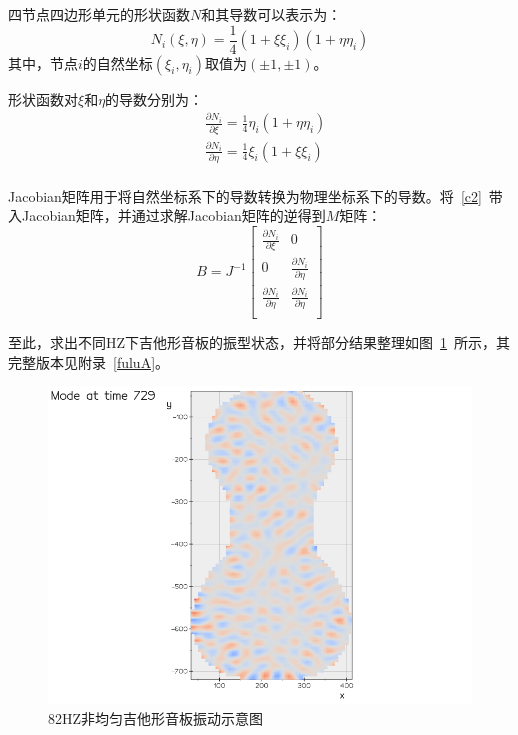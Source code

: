\documentclass[withoutpreface,bwprint]{cumcmthesis} %
\begin{document}
	四节点四边形单元的形状函数$N$和其导数可以表示为：
	\begin{equation}
		N_i(\xi,\eta)=\frac{1}{4}(1+\xi \xi_i)(1+\eta \eta_i)\label{c1}
	\end{equation}
	其中，节点$i$的自然坐标$(\xi_i,\eta_i)$取值为$(\pm1,\pm1)$。
	
	形状函数对$\xi$和$\eta$的导数分别为：
	\begin{equation}
		\begin{aligned} 
		&\frac{\partial N_i}{\partial \xi}=\frac{1}{4}\eta_i(1+\eta \eta_i)\\
		&\frac{\partial N_i}{\partial \eta}=\frac{1}{4}\xi_i(1+\xi \xi_i)\\
	\end{aligned}\label{c2}
	\end{equation}
		
	Jacobian矩阵用于将自然坐标系下的导数转换为物理坐标系下的导数。将~\eqref{c2}~带入Jacobian矩阵，并通过求解Jacobian矩阵的逆得到$M$矩阵：
		\begin{equation}
		B=J^{-1}\begin{bmatrix}
			\frac{\partial N_i}{\partial \xi}&0\\
			0&\frac{\partial N_i}{\partial \eta}\\
			\frac{\partial N_i}{\partial \eta}&\frac{\partial N_i}{\partial \eta}\\
		\end{bmatrix}\label{c3}
	\end{equation}

至此，求出不同HZ下吉他形音板的振型状态，并将部分结果整理如图~\ref{guitarbufen}~所示，其完整版本见附录~\ref{fuluA}。 
\begin{figure}[H]
\centering %
\includegraphics[width=0.7\linewidth]{CUMCMThesis-master/figures/82.png}\caption{82HZ非均匀吉他形音板振动示意图}
\label{guitarbufen}
\end{figure}
\end{document}
